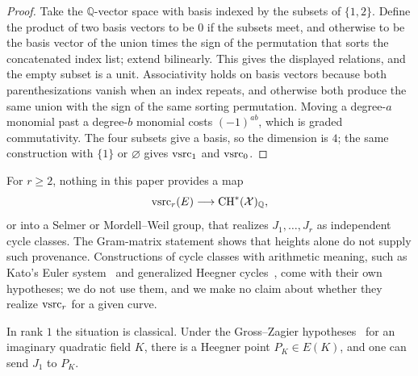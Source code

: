 \documentclass[11pt]{article}
\theoremstyle{definition}
\newcommand{\Q}{\mathbb{Q}}
\begin{document}
\begin{proof}
Take the $\Q$-vector space with basis indexed by the subsets of
$\{1,2\}$.  Define the product of two basis vectors to be $0$ if the
subsets meet, and otherwise to be the basis vector of the union times the
sign of the permutation that sorts the concatenated index list; extend
bilinearly.  This gives the displayed relations, and the empty subset is a
unit.  Associativity holds on basis vectors because both
parenthesizations vanish when an index repeats, and otherwise both
produce the same union with the sign of the same sorting permutation.
Moving a degree-$a$ monomial past a degree-$b$ monomial costs
$(-1)^{ab}$, which is graded commutativity.  The four subsets give a basis,
so the dimension is $4$; the same construction with $\{1\}$ or
$\varnothing$ gives $\mathrm{vsrc}_1$ and $\mathrm{vsrc}_0$.
\end{proof}

\begin{remark}\label{rmk:apparatus:vsrc-no-licensed-descent}
For $r\ge2$, nothing in this paper provides a map
\[
  \vsrc_r(E)\longrightarrow \mathrm{CH}^*(\mathcal X)_{\Q},
\]
or into a Selmer or Mordell--Weil group, that realizes $J_1,\ldots,J_r$ as
independent cycle classes.  The Gram-matrix statement
 shows that heights alone do not
supply such provenance.  Constructions of cycle classes with arithmetic
meaning, such as Kato's Euler system~\citep{Kato2004} and generalized
Heegner cycles~\citep{BertoliniDarmonPrasanna2013}, come with their own
hypotheses; we do not use them, and we make no claim about whether they
realize $\mathrm{vsrc}_r$ for a given curve.
\end{remark}

In rank $1$ the situation is classical.  Under the Gross--Zagier
hypotheses~\citep{GrossZagier1986,Kolyvagin1990} for an imaginary
quadratic field $K$, there is a Heegner point $P_K\in E(K)$, and one can
send $J_1$ to $P_K$.
\end{document}
